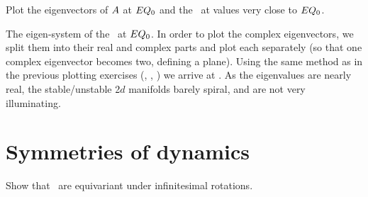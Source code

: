 {\label{exer:PlotEigenE0}
Plot the eigenvectors of $A$ at $EQ_{0}$ and the \cLf\
at values very close to $EQ_{0}$.
}

         {The eigen-system of the \stabmat\ at $EQ_{0}$.}{
In order to plot the complex eigenvectors, we split them into
their real and complex parts and plot each separately (so
that one complex eigenvector becomes two, defining a plane).
Using the same method as in the previous plotting exercises
(, , 
) we arrive at \reffig{fig:CLEE0}.
As the eigenvalues are nearly real, the stable/unstable 2$d$
manifolds barely spiral, and are not very illuminating.
} %

\section{Symmetries of dynamics}




   { \label{exer:InfinRotInvari}
Show that \cLe\ are equivariant under infinitesimal  rotations.
    }


